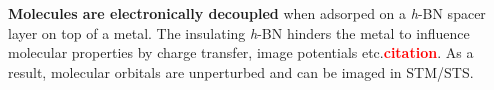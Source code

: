 \textbf{Molecules are electronically decoupled} when adsorped on a \textit{h}-BN spacer layer on top of a metal. The insulating \textit{h}-BN hinders the metal to influence molecular properties by charge transfer, image potentials etc.\textcolor{red}{\textbf{citation}}. As a result, molecular orbitals are unperturbed and can be imaged in STM/STS.